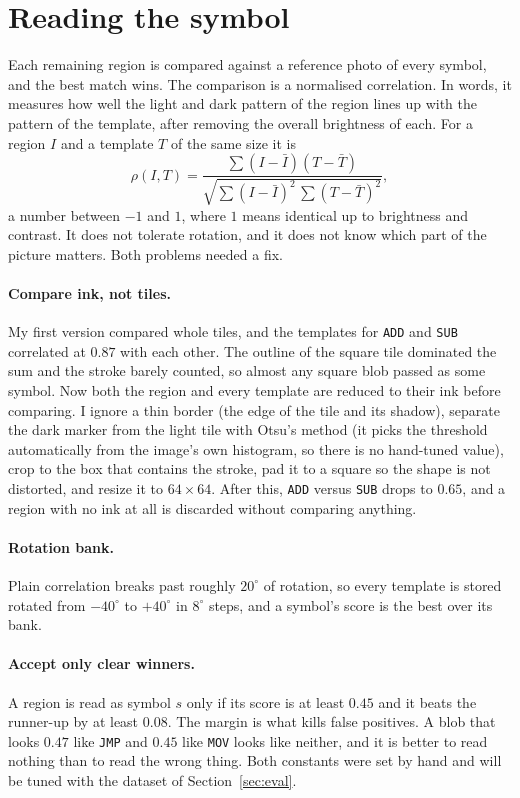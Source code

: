 \documentclass[11pt,a4paper]{article}
\newcommand{\code}[1]{\texttt{#1}}
\begin{document}
\section{Reading the symbol}

Each remaining region is compared against a reference photo of every symbol, and the best match wins. The comparison is a normalised correlation. In words, it measures how well the light and dark pattern of the region lines up with the pattern of the template, after removing the overall brightness of each. For a region $I$ and a template $T$ of the same size it is
\[
  \rho(I,T) = \frac{\sum (I-\bar I)(T-\bar T)}{\sqrt{\sum (I-\bar I)^2 \,\sum (T-\bar T)^2}},
\]
a number between $-1$ and $1$, where $1$ means identical up to brightness and contrast. It does not tolerate rotation, and it does not know which part of the picture matters. Both problems needed a fix.

\paragraph{Compare ink, not tiles.} My first version compared whole tiles, and the templates for \code{ADD} and \code{SUB} correlated at $0.87$ with each other. The outline of the square tile dominated the sum and the stroke barely counted, so almost any square blob passed as some symbol. Now both the region and every template are reduced to their ink before comparing. I ignore a thin border (the edge of the tile and its shadow), separate the dark marker from the light tile with Otsu's method (it picks the threshold automatically from the image's own histogram, so there is no hand-tuned value), crop to the box that contains the stroke, pad it to a square so the shape is not distorted, and resize it to $64\times64$. After this, \code{ADD} versus \code{SUB} drops to $0.65$, and a region with no ink at all is discarded without comparing anything.

\paragraph{Rotation bank.} Plain correlation breaks past roughly $20^\circ$ of rotation, so every template is stored rotated from $-40^\circ$ to $+40^\circ$ in $8^\circ$ steps, and a symbol's score is the best over its bank.

\paragraph{Accept only clear winners.} A region is read as symbol $s$ only if its score is at least $0.45$ and it beats the runner-up by at least $0.08$. The margin is what kills false positives. A blob that looks $0.47$ like \code{JMP} and $0.45$ like \code{MOV} looks like neither, and it is better to read nothing than to read the wrong thing. Both constants were set by hand and will be tuned with the dataset of Section~\ref{sec:eval}.
\end{document}
